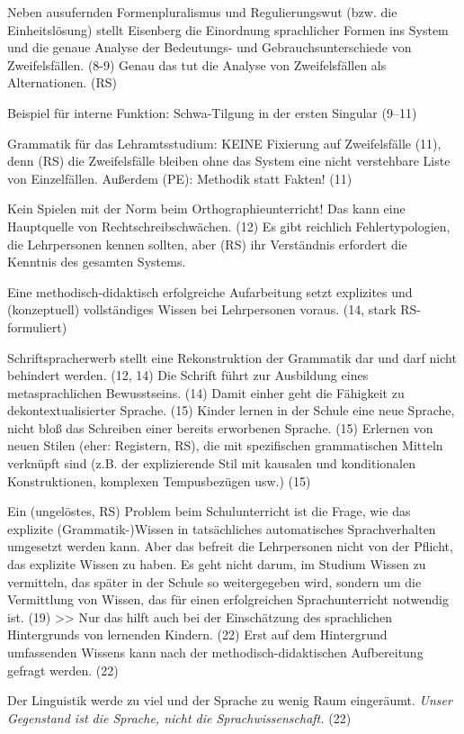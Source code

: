 Neben ausufernden Formenpluralismus und Regulierungswut (bzw. die Einheitslösung) stellt Eisenberg die Einordnung sprachlicher Formen ins System und die genaue Analyse der Bedeutungs- und Gebrauchsunterschiede von Zweifelsfällen. (8-9) Genau das tut die Analyse von Zweifelsfällen als Alternationen. (RS)

Beispiel für interne Funktion: Schwa-Tilgung in der ersten Singular (9--11)

Grammatik für das Lehramtsstudium: KEINE Fixierung auf Zweifelsfälle (11), denn (RS) die Zweifelsfälle bleiben ohne das System eine nicht verstehbare Liste von Einzelfällen. Außerdem (PE): Methodik statt Fakten! (11)

Kein Spielen mit der Norm beim Orthographieunterricht! Das kann eine Hauptquelle von Rechtschreibschwächen. (12) Es gibt reichlich Fehlertypologien, die Lehrpersonen kennen sollten, aber (RS) ihr Verständnis erfordert die Kenntnis des gesamten Systems.

Eine methodisch-didaktisch erfolgreiche Aufarbeitung setzt explizites und (konzeptuell) vollständiges Wissen bei Lehrpersonen voraus. (14, stark RS-formuliert)

Schriftspracherwerb stellt eine Rekonstruktion der Grammatik dar und darf nicht behindert werden. (12, 14)
Die Schrift führt zur Ausbildung eines metasprachlichen Bewusstseins. (14)
Damit einher geht die Fähigkeit zu dekontextualisierter Sprache. (15)
Kinder lernen in der Schule eine neue Sprache, nicht bloß das Schreiben einer bereits erworbenen Sprache. (15)
Erlernen von neuen Stilen (eher: Registern, RS), die mit spezifischen grammatischen Mitteln verknüpft sind (z.B. der explizierende Stil mit kausalen und konditionalen Konstruktionen, komplexen Tempusbezügen usw.) (15)

Ein (ungelöstes, RS) Problem beim Schulunterricht ist die Frage, wie das explizite (Grammatik-)Wissen in tatsächliches automatisches Sprachverhalten umgesetzt werden kann.
Aber das befreit die Lehrpersonen nicht von der Pflicht, das explizite Wissen zu haben.
Es geht nicht darum, im Studium Wissen zu vermitteln, das später in der Schule so weitergegeben wird, sondern um die Vermittlung von Wissen, das für einen erfolgreichen Sprachunterricht notwendig ist. (19)
>>
Nur das hilft auch bei der Einschätzung des sprachlichen Hintergrunds von lernenden Kindern. (22)
Erst auf dem Hintergrund umfassenden Wissens kann nach der methodisch-didaktischen Aufbereitung gefragt werden. (22)


Der Linguistik werde zu viel und der Sprache zu wenig Raum eingeräumt. 
\textit{Unser Gegenstand ist die Sprache, nicht die Sprachwissenschaft.} (22)


